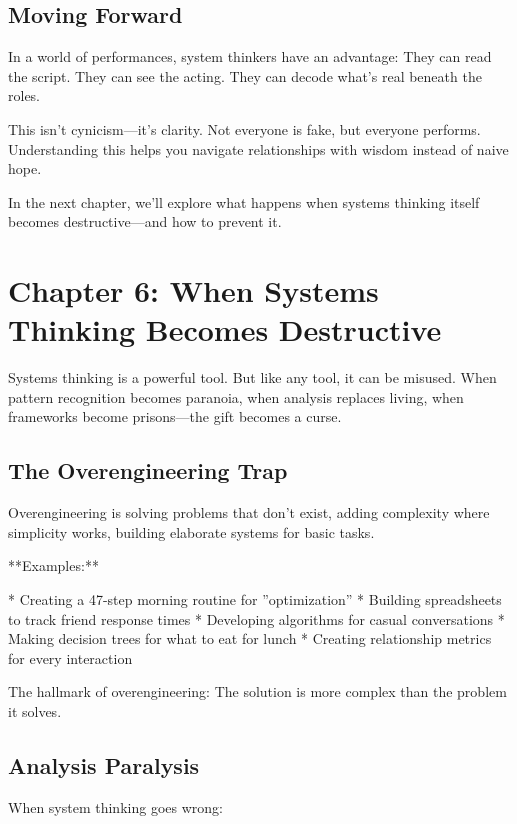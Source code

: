\documentclass[12pt,oneside]{book}
\begin{document}
\section{Moving Forward}

In a world of performances, system thinkers have an advantage: They can read the script. They can see the acting. They can decode what's real beneath the roles.

This isn't cynicism---it's clarity. Not everyone is fake, but everyone performs. Understanding this helps you navigate relationships with wisdom instead of naive hope.

In the next chapter, we'll explore what happens when systems thinking itself becomes destructive---and how to prevent it.

\chapter{Chapter 6: When Systems Thinking Becomes Destructive}

Systems thinking is a powerful tool. But like any tool, it can be misused. When pattern recognition becomes paranoia, when analysis replaces living, when frameworks become prisons---the gift becomes a curse.

\section{The Overengineering Trap}

Overengineering is solving problems that don't exist, adding complexity where simplicity works, building elaborate systems for basic tasks.

**Examples:**

                    * Creating a 47-step morning routine for ''optimization''
                    * Building spreadsheets to track friend response times
                    * Developing algorithms for casual conversations
                    * Making decision trees for what to eat for lunch
                    * Creating relationship metrics for every interaction

The hallmark of overengineering: The solution is more complex than the problem it solves.

\section{Analysis Paralysis}

When system thinking goes wrong:
\end{document}
